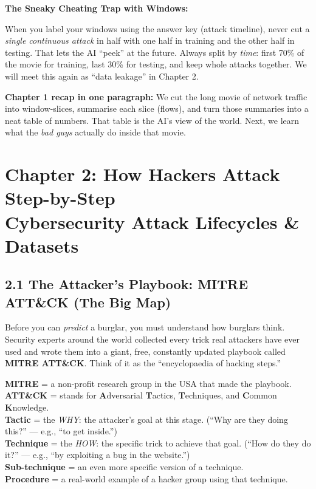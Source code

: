 \documentclass[11pt,a4paper]{article}
\begin{document}
\begin{warnbox}
\textbf{The Sneaky Cheating Trap with Windows:}

When you label your windows using the answer key (attack timeline), never cut
a \emph{single continuous attack} in half with one half in training and the
other half in testing. That lets the AI ``peek'' at the future. Always split
by \emph{time}: first 70\% of the movie for training, last 30\% for testing,
and keep whole attacks together. We will meet this again as ``data leakage''
in Chapter 2.
\end{warnbox}

\begin{recap}
\textbf{Chapter 1 recap in one paragraph:}
We cut the long movie of network traffic into window-slices, summarise each
slice (flows), and turn those summaries into a neat table of numbers. That
table is the AI's view of the world. Next, we learn what the \emph{bad
guys} actually do inside that movie.
\end{recap}

\newpage

\section{Chapter 2: How Hackers Attack Step-by-Step \\
\small Cybersecurity Attack Lifecycles \& Datasets}

\subsection{2.1 The Attacker's Playbook: MITRE ATT\&CK (The Big Map)}
\label{sec:mitre}

Before you can \emph{predict} a burglar, you must understand how burglars think.
Security experts around the world collected every trick real attackers have
ever used and wrote them into a giant, free, constantly updated playbook called
\textbf{MITRE ATT\&CK}. Think of it as the ``encyclopaedia of hacking steps.''

\begin{jargonbox}
\textbf{MITRE} = a non-profit research group in the USA that made the playbook.\\
\textbf{ATT\&CK} = stands for \textbf{A}dversarial \textbf{T}actics,
\textbf{T}echniques, and \textbf{C}ommon \textbf{K}nowledge.\\
\textbf{Tactic} = the \emph{WHY}: the attacker's goal at this stage. (``Why
are they doing this?'' --- e.g., ``to get inside.'')\\
\textbf{Technique} = the \emph{HOW}: the specific trick to achieve that goal.
(``How do they do it?'' --- e.g., ``by exploiting a bug in the website.'')\\
\textbf{Sub-technique} = an even more specific version of a technique.\\
\textbf{Procedure} = a real-world example of a hacker group using that technique.
\end{jargonbox}
\end{document}
